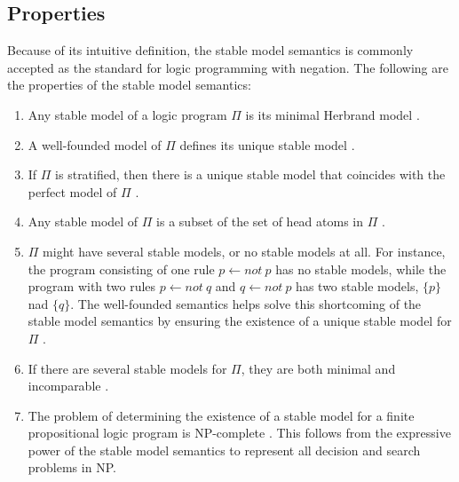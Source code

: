 \subsection{Properties}
Because of its intuitive definition, the stable model semantics is commonly 
accepted as the standard for logic programming with negation. The 
following are the properties of the stable model semantics:
\begin{enumerate}[label=(\roman*)]
    \item Any stable model of a logic program $\Pi$ is its minimal Herbrand model \cite{gelfond}. 
    \item A well-founded model of $\Pi$ defines its unique stable model \cite{gelfond}. 
    \item If $\Pi$ is stratified, then there is a unique stable model that coincides 
    with the perfect model of $\Pi$ \cite{gelfond}.
    \item Any stable model of $\Pi$ is a subset of the set of head atoms in $\Pi$ \cite{ferraris}.
    \item $\Pi$ might have several stable models, or no stable models at all. For 
    instance, the program consisting of one rule $p \leftarrow not \: p$ has no 
    stable models, while the program with two rules $p \leftarrow not \: q$ 
    and $q \leftarrow not \: p$ has two stable models, $\{p\}$ nad $\{q\}$. The 
    well-founded semantics helps solve this shortcoming of the stable model 
    semantics by ensuring the existence of a unique stable model for $\Pi$ \cite{fitting}.
    \item If there are several stable models for $\Pi$, they are both minimal 
    and incomparable \cite{fitting}. 
    \item The problem of determining the existence of a stable model for a finite 
    propositional logic program is NP-complete \cite{marek}. This follows from the expressive 
    power of the stable model semantics to represent all decision and search 
    problems in NP. 
\end{enumerate}

